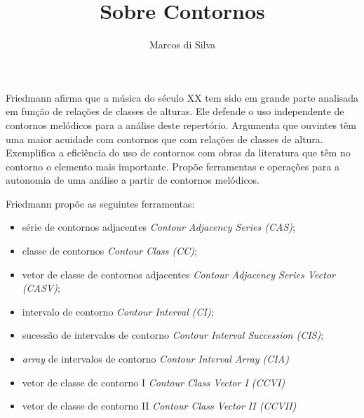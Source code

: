 \documentclass{article}
\title{Sobre Contornos}
\author{Marcos di Silva}
\newcommand{\eng}[1]{\textit{#1}}
\begin{document}
\setlength{\parindent}{0cm}
\maketitle

Friedmann \cite{friedmann85:_method_discus_contour} afirma que a
música do século XX tem sido em grande parte analisada em função de
relações de classes de alturas. Ele defende o uso independente de
contornos melódicos para a análise deste repertório. Argumenta que
ouvintes têm uma maior acuidade com contornos que com relações de
classes de altura. Exemplifica a eficiência do uso de contornos com
obras da literatura que têm no contorno o elemento mais
importante. Propõe ferramentas e operações para a autonomia de uma
análise a partir de contornos melódicos.

Friedmann\cite{friedmann85:_method_discus_contour} propõe as seguintes
ferramentas:

\begin{itemize}
\item série de contornos adjacentes \eng{Contour Adjacency Series
    (CAS)};
\item classe de contornos \eng{Contour Class (CC)};
\item vetor de classe de contornos adjacentes \eng{Contour Adjacency
    Series Vector (CASV)};
\item intervalo de contorno \eng{Contour Interval (CI)};
\item sucessão de intervalos de contorno \eng{Contour Interval
    Succession (CIS)};
\item \eng{array} de intervalos de contorno \eng{Contour Interval
    Array (CIA)}
\item vetor de classe de contorno I \eng{Contour Class Vector I
    (CCVI)}
\item vetor de classe de contorno II \eng{Contour Class Vector II
    (CCVII)}
\end{itemize}



\end{document}
